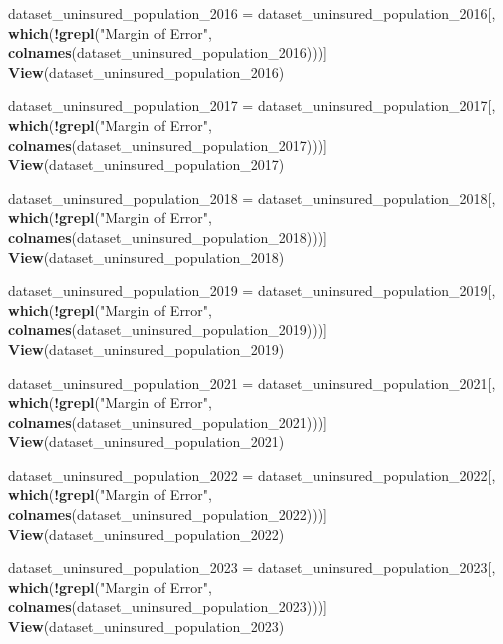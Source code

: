 \documentclass[
]{article}
\newenvironment{Shaded}{\begin{snugshade}}{\end{snugshade}}
\newcommand{\FunctionTok}[1]{\textcolor[rgb]{0.13,0.29,0.53}{\textbf{#1}}}
\newcommand{\NormalTok}[1]{#1}
\newcommand{\OtherTok}[1]{\textcolor[rgb]{0.56,0.35,0.01}{#1}}
\newcommand{\SpecialCharTok}[1]{\textcolor[rgb]{0.81,0.36,0.00}{\textbf{#1}}}
\newcommand{\StringTok}[1]{\textcolor[rgb]{0.31,0.60,0.02}{#1}}
\begin{document}
\begin{Shaded}
\begin{Highlighting}[]
\NormalTok{dataset\_uninsured\_population\_2016 }\OtherTok{=}\NormalTok{ dataset\_uninsured\_population\_2016[, }\FunctionTok{which}\NormalTok{(}\SpecialCharTok{!}\FunctionTok{grepl}\NormalTok{(}\StringTok{"Margin of Error"}\NormalTok{, }\FunctionTok{colnames}\NormalTok{(dataset\_uninsured\_population\_2016)))]}
\FunctionTok{View}\NormalTok{(dataset\_uninsured\_population\_2016)}

\NormalTok{dataset\_uninsured\_population\_2017 }\OtherTok{=}\NormalTok{ dataset\_uninsured\_population\_2017[, }\FunctionTok{which}\NormalTok{(}\SpecialCharTok{!}\FunctionTok{grepl}\NormalTok{(}\StringTok{"Margin of Error"}\NormalTok{, }\FunctionTok{colnames}\NormalTok{(dataset\_uninsured\_population\_2017)))]}
\FunctionTok{View}\NormalTok{(dataset\_uninsured\_population\_2017)}

\NormalTok{dataset\_uninsured\_population\_2018 }\OtherTok{=}\NormalTok{ dataset\_uninsured\_population\_2018[, }\FunctionTok{which}\NormalTok{(}\SpecialCharTok{!}\FunctionTok{grepl}\NormalTok{(}\StringTok{"Margin of Error"}\NormalTok{, }\FunctionTok{colnames}\NormalTok{(dataset\_uninsured\_population\_2018)))]}
\FunctionTok{View}\NormalTok{(dataset\_uninsured\_population\_2018)}

\NormalTok{dataset\_uninsured\_population\_2019 }\OtherTok{=}\NormalTok{ dataset\_uninsured\_population\_2019[, }\FunctionTok{which}\NormalTok{(}\SpecialCharTok{!}\FunctionTok{grepl}\NormalTok{(}\StringTok{"Margin of Error"}\NormalTok{, }\FunctionTok{colnames}\NormalTok{(dataset\_uninsured\_population\_2019)))]}
\FunctionTok{View}\NormalTok{(dataset\_uninsured\_population\_2019)}

\NormalTok{dataset\_uninsured\_population\_2021 }\OtherTok{=}\NormalTok{ dataset\_uninsured\_population\_2021[, }\FunctionTok{which}\NormalTok{(}\SpecialCharTok{!}\FunctionTok{grepl}\NormalTok{(}\StringTok{"Margin of Error"}\NormalTok{, }\FunctionTok{colnames}\NormalTok{(dataset\_uninsured\_population\_2021)))]}
\FunctionTok{View}\NormalTok{(dataset\_uninsured\_population\_2021)}

\NormalTok{dataset\_uninsured\_population\_2022 }\OtherTok{=}\NormalTok{ dataset\_uninsured\_population\_2022[, }\FunctionTok{which}\NormalTok{(}\SpecialCharTok{!}\FunctionTok{grepl}\NormalTok{(}\StringTok{"Margin of Error"}\NormalTok{, }\FunctionTok{colnames}\NormalTok{(dataset\_uninsured\_population\_2022)))]}
\FunctionTok{View}\NormalTok{(dataset\_uninsured\_population\_2022)}

\NormalTok{dataset\_uninsured\_population\_2023 }\OtherTok{=}\NormalTok{ dataset\_uninsured\_population\_2023[, }\FunctionTok{which}\NormalTok{(}\SpecialCharTok{!}\FunctionTok{grepl}\NormalTok{(}\StringTok{"Margin of Error"}\NormalTok{, }\FunctionTok{colnames}\NormalTok{(dataset\_uninsured\_population\_2023)))]}
\FunctionTok{View}\NormalTok{(dataset\_uninsured\_population\_2023)}


\end{Highlighting}
\end{Shaded}
\end{document}

